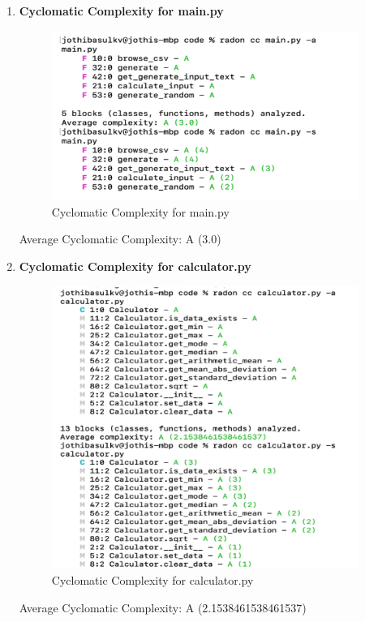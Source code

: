 \begin{enumerate}
\item \textbf{Cyclomatic Complexity for main.py}
    
\begin{figure}[!htb]
    \begin{center}
    \includegraphics[width=10cm]{images/cc_main.png} %
    \end{center}
    \caption{Cyclomatic Complexity for main.py}
\end{figure}

Average Cyclomatic Complexity: A (3.0)\\

\pagebreak
\item \textbf{Cyclomatic Complexity for calculator.py}

\begin{figure}[!htb]
    \centering
    \includegraphics[width=10cm]{images/cc_calculator.png}
    \caption{Cyclomatic Complexity for calculator.py}
\end{figure}

Average Cyclomatic Complexity:  A (2.1538461538461537)\\


\end{enumerate}
